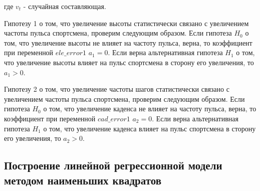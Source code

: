 \documentclass[a4paper,12pt]{article}
\begin{document}
где $v_t$ - случайная составляющая.

Гипотезу 1 о том, что увеличение высоты статистически связано с увеличением частоты пульса спортсмена, проверим следующим образом. Если гипотеза $H_0$ о том, что увеличение высоты не влияет на частоту пульса, верна, то коэффициент при переменной $ele\_error1$ $a_1 = 0$. Если верна альтернативная гипотеза $H_1$ о том, что увеличение высоты влияет на пульс спортсмена в сторону его увеличения, то $a_1 > 0$.

Гипотезу 2 о том, что увеличение частоты шагов статистически связано с увеличением частоты пульса спортсмена, проверим следующим образом. Если гипотеза $H_0$ о том, что увеличение каденса не влияет на частоту пульса, верна, то коэффициент при переменной $cad\_error1$ $a_2 = 0$. Если верна альтернативная гипотеза $H_1$ о том, что увеличение каденса влияет на пульс спортсмена в сторону его увеличения, то $a_2 > 0$.

\subsection{Построение линейной регрессионной модели методом наименьших квадратов}
\end{document}
